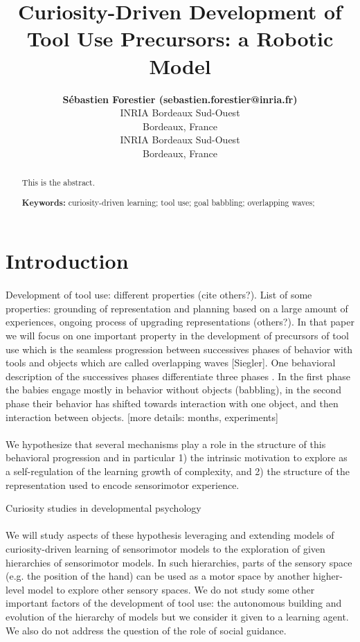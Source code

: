 \documentclass[10pt,letterpaper]{article}
\title{Curiosity-Driven Development of Tool Use Precursors: a Robotic Model}
\author{{\large \bf S\'ebastien Forestier (sebastien.forestier@inria.fr)} \\
	INRIA Bordeaux Sud-Ouest\\
	Bordeaux, France
  \AND {\large \bf Pierre-Yves Oudeyer (pierre-yves.oudeyer@inria.fr)} \\
	INRIA Bordeaux Sud-Ouest\\
	Bordeaux, France}
\begin{document}
\maketitle


\begin{abstract}
This is the abstract.

\textbf{Keywords:} 
curiosity-driven learning; tool use; goal babbling; overlapping waves; 
\end{abstract}


\section{Introduction}

	\paragraph{}
	Development of tool use: different properties \cite{guerin2013survey} (cite others?). 
	List of some properties: grounding of representation and planning based on a large amount of experiences, ongoing process of upgrading representations (others?).
	In that paper we will focus on one important property in the development of precursors of tool use which is the seamless progression 
	between successives phases of behavior with tools and objects which are called overlapping waves [Siegler]. 
	One behavioral description of the successives phases differentiate three phases \cite{guerin2013survey}.
	In the first phase the babies engage mostly in behavior without objects (babbling), in the second phase their behavior has shifted towards interaction with one object, and then interaction between objects.
	[more details: months, experiments]
	
	\paragraph{}
	We hypothesize that several mechanisms play a role in the structure of this behavioral progression and in particular 
	1) the intrinsic motivation to explore as a self-regulation of the learning growth of complexity, and 
	2) the structure of the representation used to encode sensorimotor experience.	
	
	Curiosity studies in developmental psychology 
	\cite{kidd}
	\cite{gottlieb_information-seeking_2013}
	
	\paragraph{}
	We will study aspects of these hypothesis leveraging and extending models of curiosity-driven learning of sensorimotor models to the exploration of given hierarchies of sensorimotor models.
	In such hierarchies, parts of the sensory space (e.g. the position of the hand) can be used as a motor space by another higher-level model to explore other sensory spaces.
	We do not study some other important factors of the development of tool use: the autonomous building and evolution of the hierarchy of models but we consider it given to a learning agent.
	We also do not address the question of the role of social guidance.
	
\end{document}
